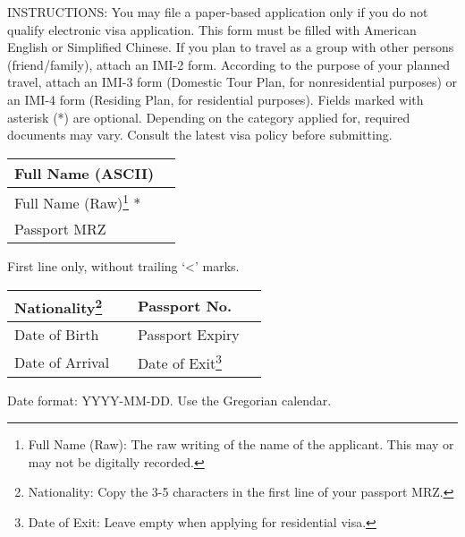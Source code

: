 




\begin{minipage}{\textwidth}
	\small
	INSTRUCTIONS:
	\inlinelistitem You may file a paper-based application only if you do not qualify electronic visa application.
	\inlinelistitem This form must be filled with American English or Simplified Chinese.
	\inlinelistitem If you plan to travel as a group with other persons (friend/family), attach an IMI-2 form.
	\inlinelistitem According to the purpose of your planned travel, attach an IMI-3 form (Domestic Tour Plan, for nonresidential purposes) or an IMI-4 form (Residing Plan, for residential purposes).
	\inlinelistitem Fields marked with asterisk (*) are optional.
	\inlinelistitem Depending on the category applied for, required documents may vary. Consult the latest visa policy before submitting.
\end{minipage}



\begin{tabu}{|l|X|}
	\hline
	{\formfieldlead Full Name (ASCII)}                                                                                                                     & {} \\
	\hline
	{\formfieldlead Full Name (Raw)\footnote{Full Name (Raw): The raw writing of the name of the applicant. This may or may not be digitally recorded.} *} & {} \\
	\hline
	{\formfieldlead Passport MRZ}                                                                                                                          & {} \\
	\hline
\end{tabu}
{\small First line only, without trailing `<' marks.}

\begin{tabu}{|l|X|l|X|}
	\hline
	{\formfieldlead Nationality\footnote{Nationality: Copy the 3-5 characters in the first line of your passport MRZ.}} & {} & {\formfieldlead Passport No.}                                                                         & {} \\
	\hline
	{\formfieldlead Date of Birth}                                                                                      & {} & {\formfieldlead Passport Expiry}                                                                      & {} \\
	\hline
	{\formfieldlead Date of Arrival}                                                                                    & {} & {\formfieldlead Date of Exit\footnote{Date of Exit: Leave empty when applying for residential visa.}} & {} \\
	\hline
\end{tabu}
{\small Date format: YYYY-MM-DD. Use the Gregorian calendar.}

